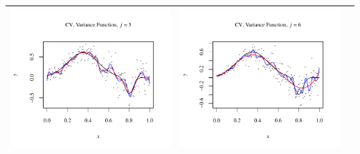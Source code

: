 \documentclass[11pt]{article}
\begin{document}
\begin{table}[h!]
\begin{center}
\begin{tabular}{| >{\centering\arraybackslash}m{2.1in} |  >{\centering\arraybackslash}m{2.1in} |  >{\centering\arraybackslash}m{2.1in}|}
      \includegraphics[width=1\linewidth,height=0.18\textheight]{Graphs/1/4/assignment5_a_1_4_5}&
      \includegraphics[width=1\linewidth,height=0.18\textheight]{Graphs/1/4/assignment5_a_1_4_6}\\\hline
    \end{tabular}
  \end{center}
\end{table}
\end{document}
